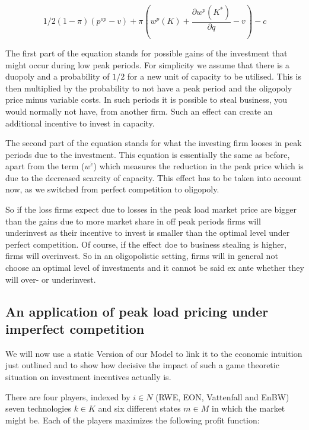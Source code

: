 \begin{equation}
	1/2 (1-\pi) (p^{op}-v) + \pi (w^p(K)+\frac{\partial w^p(K^*)}{\partial q}-v) - c
\end{equation}

The first part of the equation stands for possible gains of the investment that might occur during low peak periods. For simplicity we assume that there is a duopoly and a probability of $1/2$ for a new unit of capacity to be utilised. This is then multiplied by the probability to not have a peak period and the oligopoly price minus variable costs. In such periods it is possible to steal business, you would normally not have, from another firm. Such an effect can create an additional incentive to invest in capacity. %

The second part of the equation stands for what the investing firm looses in peak periods due to the investment. This equation is essentially the same as before, apart from the term ($w^{\acute{c}}$) which measures the reduction in the peak price which is due to the decreased scarcity of capacity. This effect has to be taken into account now, as we switched from perfect competition to oligopoly.

So if the loss firms expect due to losses in the peak load market price are bigger than the gains due to more market share in off peak periods firms will underinvest as their incentive to invest is smaller than the optimal level under perfect competition. Of course, if the effect doe to business stealing is higher, firms will overinvest. So in an oligopolistic setting, firms will in general not choose an optimal level of investments and it cannot be said ex ante whether they will over- or underinvest.

\subsection{An application of peak load pricing under imperfect competition}

We will now use a static Version of our Model to link it to the economic intuition just outlined and to show how decisive the impact of such a game theoretic situation on investment incentives actually is.

There are four players, indexed by $i\in N$ (RWE, EON, Vattenfall and EnBW) seven technologies $k\in K$  and six different states $m\in M$ in which the market might be. Each of the players maximizes the following profit function:

